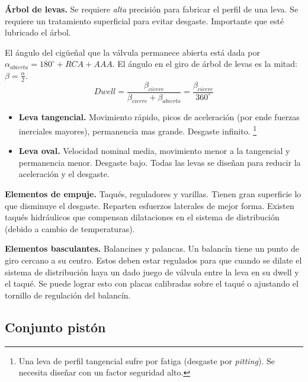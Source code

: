 \textbf{Árbol de levas.} Se requiere \textit{alta} precisión para fabricar el perfil de una leva. Se requiere un tratamiento superficial para evitar desgaste. Importante que esté lubricado el árbol.

El ángulo del cigüeñal que la válvula permanece abierta está dada por $\alpha_{abierta}=180^\circ +RCA+AAA$. El ángulo en el giro de árbol de levas es la mitad: $\beta=\frac{\alpha}{2}$.
\[
Dwell=\frac{\beta_{cierre}}{\beta_{cierre}+\beta_{abierto}}=\frac{\beta_{cierre}}{360^\circ}
\]
\begin{itemize}
    \item \textbf{Leva tangencial.} Movimiento rápido, picos de aceleración (por ende fuerzas inerciales mayores), permanencia mas grande. Desgaste infinito. \footnote{Una leva de perfil tangencial sufre por fatiga (desgaste por \textit{pitting}). Se necesita diseñar con un factor seguridad alto.}
    \item \textbf{Leva oval.} Velocidad nominal media, movimiento menor a la tangencial y permanencia menor. Desgaste bajo. Todas las levas se diseñan para reducir la aceleración y el desgaste. 
\end{itemize}

\textbf{Elementos de empuje.} Taqués, reguladores y varillas. Tienen gran superficie lo que disminuye el desgaste. Reparten esfuerzos laterales de mejor forma. Existen taqués hidráulicos que compensan dilataciones en el sistema de distribución (debido a cambio de temperaturas). 



\textbf{Elementos basculantes.} Balancines y palancas. Un balancín tiene un punto de giro cercano a su centro. Estos deben estar regulados para que cuando se dilate el sistema de distribución haya un dado juego de válvula entre la leva en su dwell y el taqué. Se puede lograr esto con placas calibradas sobre el taqué o ajustando el tornillo de regulación del balancín.

\subsection{Conjunto pistón}

